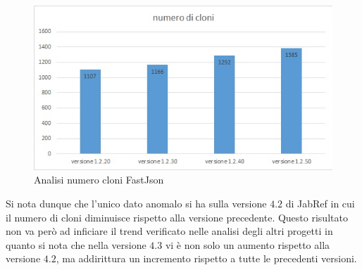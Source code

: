 \begin{figure}[h]
	\centering
	\includegraphics[scale=0.7, trim = 0cm 0cm 0cm 0cm, clip=true]{Grafici_fastJson/NumeroCloni.jpg}
	\caption{Analisi numero cloni FastJson}
	\label{fig:nCloniFastjson}
\end{figure}
Si nota dunque che l'unico dato anomalo si ha sulla versione $4.2$ di JabRef in cui il numero di cloni diminuisce rispetto alla versione precedente. Questo risultato non va però ad inficiare il trend verificato nelle analisi degli altri progetti in quanto si nota che nella versione $4.3$ vi è non solo un aumento rispetto alla versione $4.2$, ma addirittura un incremento rispetto a tutte le precedenti versioni. 

